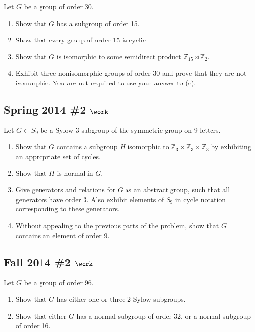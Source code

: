 Let \(G\) be a group of order 30.

\begin{enumerate}
\def\labelenumi{\alph{enumi}.}
\item
  Show that \(G\) has a subgroup of order 15.
\item
  Show that every group of order 15 is cyclic.
\item
  Show that \(G\) is isomorphic to some semidirect product
  \({\mathbb{Z}}_{15} \rtimes{\mathbb{Z}}_2\).
\item
  Exhibit three nonisomorphic groups of order 30 and prove that they are
  not isomorphic. You are not required to use your answer to (c).
\end{enumerate}

\hypertarget{spring-2014-2-work}{%
\subsection{\texorpdfstring{Spring 2014 \#2
\(\work\)}{Spring 2014 \#2 \textbackslash work}}\label{spring-2014-2-work}}

Let \(G\subset S_9\) be a Sylow-3 subgroup of the symmetric group on 9
letters.

\begin{enumerate}
\def\labelenumi{\alph{enumi}.}
\item
  Show that \(G\) contains a subgroup \(H\) isomorphic to
  \({\mathbb{Z}}_3 \times{\mathbb{Z}}_3 \times{\mathbb{Z}}_3\) by
  exhibiting an appropriate set of cycles.
\item
  Show that \(H\) is normal in \(G\).
\item
  Give generators and relations for \(G\) as an abstract group, such
  that all generators have order 3. Also exhibit elements of \(S_9\) in
  cycle notation corresponding to these generators.
\item
  Without appealing to the previous parts of the problem, show that
  \(G\) contains an element of order 9.
\end{enumerate}

\hypertarget{fall-2014-2-work}{%
\subsection{\texorpdfstring{Fall 2014 \#2
\(\work\)}{Fall 2014 \#2 \textbackslash work}}\label{fall-2014-2-work}}

Let \(G\) be a group of order 96.

\begin{enumerate}
\def\labelenumi{\alph{enumi}.}
\item
  Show that \(G\) has either one or three 2-Sylow subgroups.
\item
  Show that either \(G\) has a normal subgroup of order 32, or a normal
  subgroup of order 16.
\end{enumerate}

